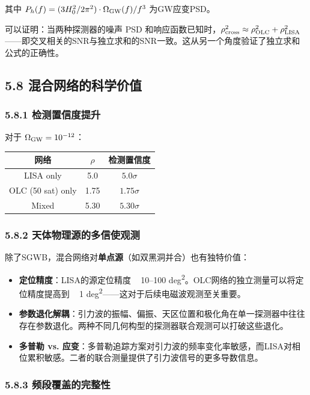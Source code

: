 \documentclass[12pt,a4paper]{article}
\begin{document}
其中 $P_h(f) = (3H_0^2/2\pi^2) \cdot \Omega_{\rm GW}(f)/f^3$ 为GW应变PSD。

可以证明：当两种探测器的噪声 PSD 和响应函数已知时，$\rho_{\rm cross}^2 \approx \rho_{\rm OLC}^2 + \rho_{\rm LISA}^2$——即交叉相关的SNR与独立求和的SNR一致。这从另一个角度验证了独立求和公式的正确性。

\subsection{5.8 混合网络的科学价值}


\subsubsection{5.8.1 检测置信度提升}


对于 $\Omega_{\rm GW} = 10^{-12}$：

\begin{tabular}{|c|c|c|}
\hline
网络 & $\rho$ & 检测置信度 \\
\hline
LISA only & 5.0 & $5.0\sigma$ \\
OLC (50 sat) only & 1.75 & $1.75\sigma$ \\
Mixed & 5.30 & $5.30\sigma$ \\
\hline
\end{tabular}


\subsubsection{5.8.2 天体物理源的多信使观测}


除了SGWB，混合网络对\textbf{单点源}（如双黑洞并合）也有独特价值：

\begin{itemize}
  \item[1] \textbf{定位精度}：LISA的源定位精度 ~ 10–100 deg\textsuperscript{2}。OLC网络的独立测量可以将定位精度提高到 ~ 1 deg\textsuperscript{2}——这对于后续电磁波观测至关重要。

  \item[2] \textbf{参数退化解耦}：引力波的振幅、偏振、天区位置和极化角在单一探测器中往往存在参数退化。两种不同几何构型的探测器联合观测可以打破这些退化。

  \item[3] \textbf{多普勒 vs. 应变}：多普勒追踪方案对引力波的频率变化率敏感，而LISA对相位累积敏感。二者的联合测量提供了引力波信号的更多导数信息。

\end{itemize}
\subsubsection{5.8.3 频段覆盖的完整性}
\end{document}

